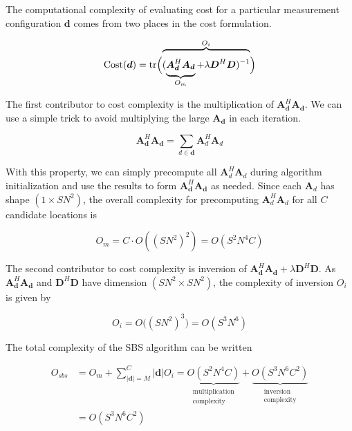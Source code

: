 \documentclass{article}
\begin{document}
The computational complexity of evaluating cost for a particular measurement
configuration $\bm{d}$ comes from two places in the cost formulation.

$$
  \text{Cost}(\bm{d}) = \text{tr} \Bigl(
  \overbrace{\vphantom{\rule[1.5em]{0pt}{0pt}}
(\underbrace{\vphantom{\rule[-0.5em]{0pt}{0pt}} \bm{A}_{\bm{d}}^H \bm{A}_{\bm{d}}}_{O_m}
+\lambda \bm{D}^H\bm{D})^{-1}
}^{O_i}
\Bigr)
$$

The first contributor to cost complexity is the multiplication of
$\bm{A}^H_{\bm{d}}\bm{A}_{\bm{d}}$.  We can use a simple trick to avoid
multiplying the large $\bm{A}_{\bm{d}}$ in each iteration.

$$
\bm{A}^H_{\bm{d}} \bm{A}_{\bm{d}} = \sum_{d \in \bm{d}} \bm{A}^H_{d} \bm{A}_{d}
$$

With this property, we can simply precompute all $\bm{A}^H_{d}\bm{A}_{d}$ during
algorithm initialization and use the results to form
$\bm{A}^H_{\bm{d}}\bm{A}_{\bm{d}}$ as needed.
Since each $\bm{A}_d$ has shape $(1 \times SN^2)$, the overall complexity for precomputing $\bm{A}^H_d \bm{A}_d$ for all $C$ candidate locations is

$$
O_m = C \cdot O((SN^2)^2) = O(S^2N^4C)
$$

The second contributor to cost complexity is inversion of $\bm{A}^H_{\bm{d}}
\bm{A}_{\bm{d}} + \lambda\bm{D}^H \bm{D}$.
As $\bm{A}^H_{\bm{d}} \bm{A}_{\bm{d}}$ and $\bm{D}^H \bm{D}$ have dimension $(SN^2
\times SN^2)$, the complexity of inversion $O_i$ is given by

$$O_i = O\big( (SN^2)^3 \big) = O(S^3N^6)$$

The total complexity of the SBS algorithm can be written

\begin{align*}
  O_{sbs} &= O_m + \sum_{|\bm{d}| = M}^C |\bm{d}| O_i =
  \underbrace{
  O(S^2N^4C)
  }_{\substack{\text{multiplication}\\ \text{complexity}}}
  +
  \underbrace{
  O(S^3N^6C^2)
  }_{\substack{\text{inversion}\\ \text{complexity}}} \\
  &= O(S^3N^6C^2)
\end{align*}

\end{document}

